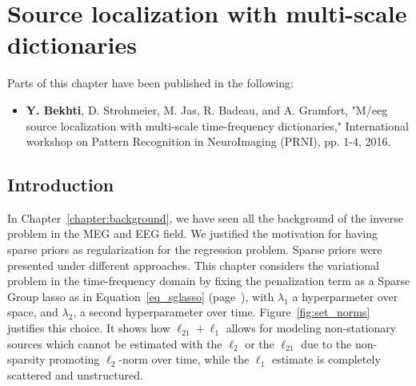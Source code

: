 
\chapter{Source localization with multi-scale dictionaries} %

\label{chapter:multiscale} %
\noindent\makebox[\linewidth]{\rule{0.75\paperwidth}{0.4pt}}
\noindent\makebox[\linewidth]{\rule{0.75\paperwidth}{0.4pt}}

\localtableofcontents %

\noindent\makebox[\linewidth]{\rule{0.75\paperwidth}{0.4pt}}
\noindent\makebox[\linewidth]{\rule{0.75\paperwidth}{0.4pt}}

\vspace{1.5cm}
Parts of this chapter have been published in the following:
\begin{itemize}
\item \textbf{Y. Bekhti}, D. Strohmeier, M. Jas, R. Badeau, and A. Gramfort, "M/\ac{eeg} source localization with multi-scale time-frequency dictionaries," International workshop on Pattern Recognition in NeuroImaging (PRNI), pp. 1-4, 2016.
\end{itemize}
\newpage

\section{Introduction}
In Chapter~\ref{chapter:background}, we have seen all the background of the inverse problem in the MEG and EEG field. We justified the motivation for having sparse priors as regularization for the regression problem. Sparse priors were presented under different approaches. This chapter considers the variational problem in the time-frequency domain by fixing the penalization term as a Sparse Group \ac{lasso} as in Equation~\eqref{eq_sglasso} (page~\pageref{eq_sglasso}), with $\lambda_1$ a hyperparmeter over space, and $\lambda_2$, a second hyperparameter over time. Figure~\ref{fig:set_norms} justifies this choice. It shows how $\ell_{21}+\ell_1$ allows for modeling non-stationary sources which cannot be estimated with the $\ell_2$ or the $\ell_{21}$ due to the non-sparsity promoting $\ell_2$-norm over time, while the $\ell_1$ estimate is completely scattered and unstructured.\\

